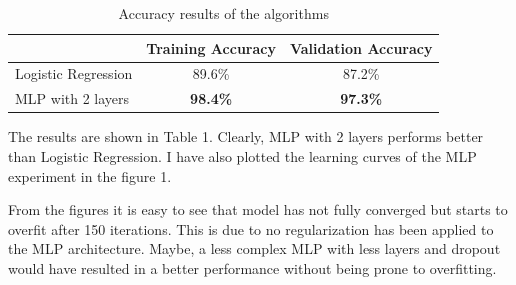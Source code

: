 \documentclass[12pt]{article}
\begin{document}
\begin{table}[h]
	\centering
	\label{my-label}
	\begin{tabular}{@{}lcc@{}}
		\toprule
		& Training Accuracy & Validation Accuracy \\ \midrule
		Logistic Regression & 89.6\%           & 87.2\%             \\
		MLP with 2 layers   & \textbf{98.4\%}  & \textbf{97.3\%}    \\ \bottomrule
	\end{tabular}
	\caption{Accuracy results of the algorithms}
\end{table}

The results are shown in Table 1.
Clearly, MLP with 2 layers performs better than Logistic Regression.
I have also plotted the learning curves of the MLP experiment in the figure 1.


From the figures it is easy to see that model has not fully converged but starts to overfit after 150 iterations.
This is due to no regularization has been applied to the MLP architecture.
Maybe, a less complex MLP with less layers and dropout would have resulted in a better performance without being prone to overfitting.



\end{document}
